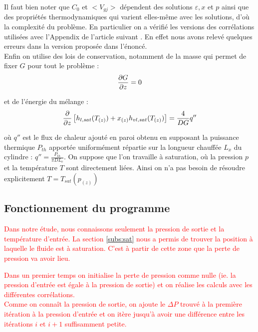 Il faut bien noter que $C_0$ et $<V_{gj}>$ dépendent des solutions $\varepsilon,x$ et $p$ ainsi que des propriétés thermodynamiques qui varient elles-même avec les solutions, d'où la complexité du problème. En particulier on a vérifié les versions des corrélations utilisées avec l'Appendix de l'article suivant \cite{coddingtonStudyPerformanceVoid2002}. En effet nous avons relevé quelques erreurs dans la version proposée dans l'énoncé.\\ 

Enfin on utilise des lois de conservation, notamment de la masse qui permet de fixer $G$ pour tout le problème :
\begin{equation}
    \pder[G]{z} = 0
\end{equation}

et de l'énergie du mélange :
\begin{equation}
    \pder{z} \left[ h_{l,sat}(T_{(z)})+x_{(z)}h_{vl,sat}(T_{(z)})\right] = \frac{4}{DG}q''
\label{eq:titre}
\end{equation}

où $q''$ est le flux de chaleur ajouté en paroi obtenu en supposant la puissance thermique $P_{th}$ apportée uniformément répartie sur la longueur chauffée $L_x$ du cylindre : $q'' = \frac{P_{th}}{\pi DL_c}$. On suppose que l'on travaille à saturation, où la pression $p$ et la température $T$ sont directement liées. Ainsi on n'a pas besoin de résoudre explicitement $T = T_{sat}(p_{(z)})$\\ \par


\subsection{Fonctionnement du programme}
\textcolor{red}{Dans notre étude, nous connaissons seulement la pression de sortie et la température d'entrée. La section \ref{subs:sat} nous a permis de trouver la position à laquelle le fluide est à saturation. C'est à partir de cette zone que la perte de pression va avoir lieu.} \\ \par
\textcolor{red}{Dans un premier temps on initialise la perte de pression comme nulle (ie. la pression d'entrée est égale à la pression de sortie) et on réalise les calculs avec les différentes corrélations.} \\
\textcolor{red}{Comme on connaît la pression de sortie, on ajoute le $\Delta P$ trouvé à la première itération à la pression d'entrée et on itère jusqu'à avoir une différence entre les itérations $i$ et $i+1$ suffisamment petite.}
